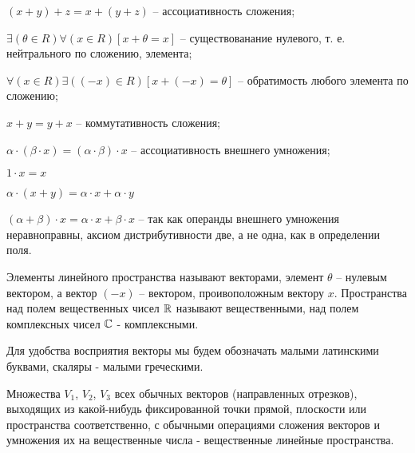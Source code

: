 \begin{list}{.}{}
\item
$(x+y)+z=x+(y+z)$ -- ассоциативность сложения;
\item
$\exists(\theta\in R)\forall(x\in R)[x+\theta=x]$ -- существованание нулевого, т. е. нейтрального по сложению, элемента;
\item
$\forall(x\in R)\exists((-x)\in R)[x+(-x)=\theta]$ -- обратимость любого элемента по сложению;
\item
$x+y=y+x$ -- коммутативность сложения;
\item
$\alpha\cdot(\beta\cdot x)=(\alpha\cdot\beta)\cdot x$ -- ассоциативность внешнего умножения;
\item
$1\cdot x=x$
\item
$\alpha\cdot(x+y)=\alpha\cdot x + \alpha\cdot y$
\item
$(\alpha+\beta)\cdot x = \alpha\cdot x + \beta \cdot x$ -- так как операнды внешнего умножения неравноправны, аксиом дистрибутивности две, а не одна, как в определении поля.
\end{list}

Элементы линейного пространства называют векторами, элемент $\theta$ -- нулевым вектором, а вектор $(-x)$ -- вектором, проивоположным вектору $x$. Пространства над полем вещественных чисел $\mathbb{R}$ называют вещественными, над полем комплексных чисел $\mathbb{C}$ - комплексными.

Для удобства восприятия векторы мы будем обозначать малыми латинскими буквами, скаляры - малыми греческими. 

\begin{primer}
Множества $V_1$, $V_2$, $V_3$ всех обычных векторов (направленных отрезков), выходящих из какой-нибудь фиксированной точки прямой, плоскости или пространства соответственно, с обычными операциями сложения векторов и умножения их на вещественные числа - вещественные линейные пространства.
\end{primer}



